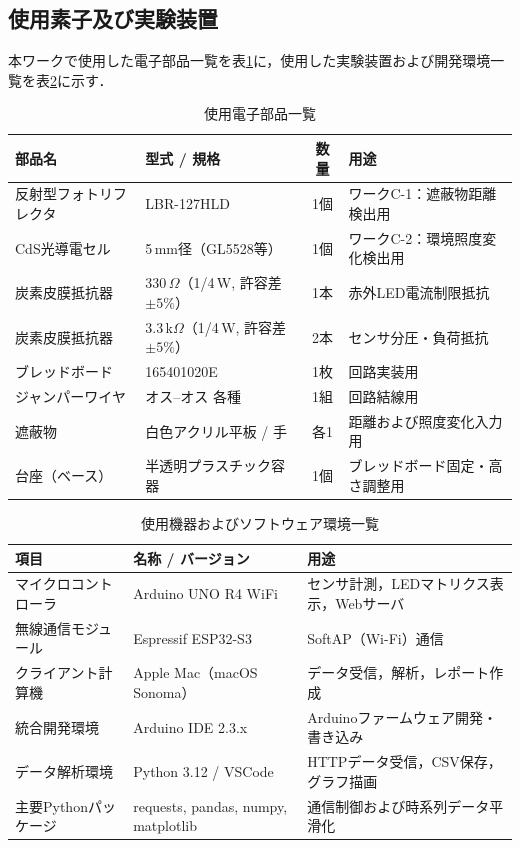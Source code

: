 \subsection{使用素子及び実験装置}

本ワークで使用した電子部品一覧を表\ref{tab:components_work_C}に，使用した実験装置および開発環境一覧を表\ref{tab:instruments_work_C}に示す．

\begin{table}[htbp]
  \caption{使用電子部品一覧}
  \centering
  \small
  \begin{tabular}{|p{4.2cm}|p{4.2cm}|c|p{4.8cm}|}
    \hline
    部品名 & 型式 / 規格 & 数量 & 用途 \\
    \hline\hline
    反射型フォトリフレクタ & LBR-127HLD & 1個 & ワークC-1：遮蔽物距離検出用 \\
    \hline
    CdS光導電セル & 5\,mm径（GL5528等） & 1個 & ワークC-2：環境照度変化検出用 \\
    \hline
    炭素皮膜抵抗器 & 330\,$\Omega$（1/4\,W, 許容差$\pm 5\%$） & 1本 & 赤外LED電流制限抵抗 \\
    \hline
    炭素皮膜抵抗器 & 3.3\,k$\Omega$（1/4\,W, 許容差$\pm 5\%$） & 2本 & センサ分圧・負荷抵抗 \\
    \hline
    ブレッドボード & 165401020E & 1枚 & 回路実装用 \\
    \hline
    ジャンパーワイヤ & オス--オス 各種 & 1組 & 回路結線用 \\
    \hline
    遮蔽物 & 白色アクリル平板 / 手 & 各1 & 距離および照度変化入力用 \\
    \hline
    台座（ベース） & 半透明プラスチック容器 & 1個 & ブレッドボード固定・高さ調整用 \\
    \hline
  \end{tabular}
  \label{tab:components_work_C}
\end{table}

\begin{table}[htbp]
  \caption{使用機器およびソフトウェア環境一覧}
  \centering
  \small
  \begin{tabular}{|p{3.8cm}|p{5.2cm}|p{5.5cm}|}
    \hline
    項目 & 名称 / バージョン & 用途 \\
    \hline\hline
    マイクロコントローラ & Arduino UNO R4 WiFi & センサ計測，LEDマトリクス表示，Webサーバ \\
    \hline
    無線通信モジュール & Espressif ESP32-S3 & SoftAP（Wi-Fi）通信 \\
    \hline
    クライアント計算機 & Apple Mac（macOS Sonoma） & データ受信，解析，レポート作成 \\
    \hline
    統合開発環境 & Arduino IDE 2.3.x & Arduinoファームウェア開発・書き込み \\
    \hline
    データ解析環境 & Python 3.12 / VSCode & HTTPデータ受信，CSV保存，グラフ描画 \\
    \hline
    主要Pythonパッケージ & requests, pandas, numpy, matplotlib & 通信制御および時系列データ平滑化 \\
    \hline
  \end{tabular}
  \label{tab:instruments_work_C}
\end{table}



